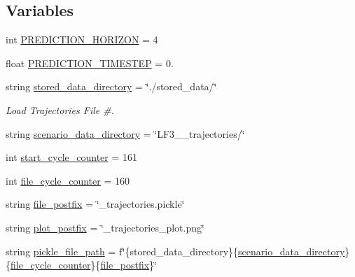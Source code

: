 \subsection*{Variables}
\begin{DoxyCompactItemize}
\item 
int \hyperlink{namespaceimplementation_1_1trajectory__plotter_a20786244527d253b1ef4d72e27f80a2c}{P\+R\+E\+D\+I\+C\+T\+I\+O\+N\+\_\+\+H\+O\+R\+I\+Z\+ON} = 4
\item 
float \hyperlink{namespaceimplementation_1_1trajectory__plotter_a121d06c9ffac4e3b6355f379f2869231}{P\+R\+E\+D\+I\+C\+T\+I\+O\+N\+\_\+\+T\+I\+M\+E\+S\+T\+EP} = 0.
\item 
string \hyperlink{namespaceimplementation_1_1trajectory__plotter_a2de06e242ae62492442f107df1982be5}{stored\+\_\+data\+\_\+directory} = \char`\"{}./stored\+\_\+data/\char`\"{}
\begin{DoxyCompactList}\small\item\em Load Trajectories File \#. \end{DoxyCompactList}\item 
string \hyperlink{namespaceimplementation_1_1trajectory__plotter_a8cd16ae40d4a9e36d8aa403f58180906}{scenario\+\_\+data\+\_\+directory} = \char`\"{}L\+F3\+\_\+\_\+trajectories/\char`\"{}
\item 
int \hyperlink{namespaceimplementation_1_1trajectory__plotter_abc4e8cef0c35831ea4ee9a13c488758d}{start\+\_\+cycle\+\_\+counter} = 161
\item 
int \hyperlink{namespaceimplementation_1_1trajectory__plotter_a230271bc03fa2b0dc367f3c14e161d39}{file\+\_\+cycle\+\_\+counter} = 160
\item 
string \hyperlink{namespaceimplementation_1_1trajectory__plotter_a23f118bd7b214f9eb1baf44b98fb2312}{file\+\_\+postfix} = \char`\"{}\+\_\+trajectories.\+pickle\char`\"{}
\item 
string \hyperlink{namespaceimplementation_1_1trajectory__plotter_a79541972f50d0a8493d777e6eff64e8f}{plot\+\_\+postfix} = \char`\"{}\+\_\+trajectories\+\_\+plot.\+png\char`\"{}
\item 
string \hyperlink{namespaceimplementation_1_1trajectory__plotter_a04d83f0f36286c497bf007c9308a4b95}{pickle\+\_\+file\+\_\+path} = f\char`\"{}\{stored\+\_\+data\+\_\+directory\}\{\hyperlink{namespaceimplementation_1_1trajectory__plotter_a8cd16ae40d4a9e36d8aa403f58180906}{scenario\+\_\+data\+\_\+directory}\}\{\hyperlink{namespaceimplementation_1_1trajectory__plotter_a230271bc03fa2b0dc367f3c14e161d39}{file\+\_\+cycle\+\_\+counter}\}\{\hyperlink{namespaceimplementation_1_1trajectory__plotter_a23f118bd7b214f9eb1baf44b98fb2312}{file\+\_\+postfix}\}\char`\"{}

\end{DoxyCompactItemize}
